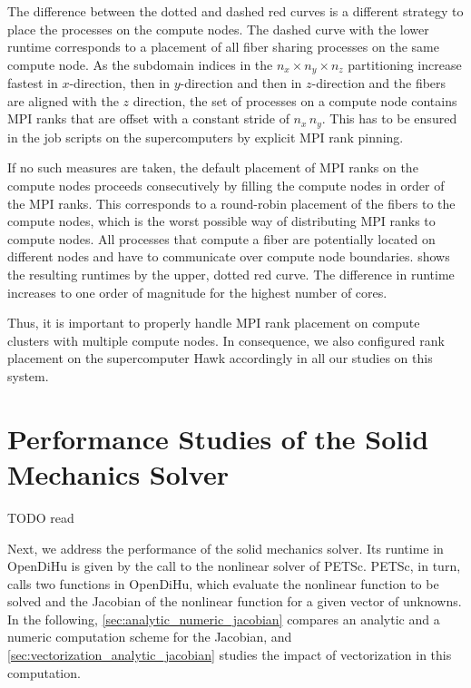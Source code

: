 The difference between the dotted and dashed red curves is a different strategy to place the processes on the compute nodes. The dashed curve with the lower runtime corresponds to a placement of all fiber sharing processes on the same compute node. As the subdomain indices in the $n_x \times n_y \times n_z$ partitioning increase fastest in $x$-direction, then in $y$-direction and then in $z$-direction and the fibers are aligned with the $z$ direction, the set of processes on a compute node contains MPI ranks that are offset with a constant stride of $n_x\,n_y$. This has to be ensured in the job scripts on the supercomputers by explicit MPI rank pinning.

If no such measures are taken, the default placement of MPI ranks on the compute nodes proceeds consecutively by filling the compute nodes in order of the MPI ranks. This corresponds to a round-robin placement of the fibers to the compute nodes, which is the worst possible way of distributing MPI ranks to compute nodes. All processes that compute a fiber are potentially located on different nodes and have to communicate over compute node boundaries.
 shows the resulting runtimes by the upper, dotted red curve. The difference in runtime increases to one order of magnitude for the highest number of cores.

Thus, it is important to properly handle MPI rank placement on compute clusters with multiple compute nodes. In consequence, we also configured rank placement on the supercomputer Hawk accordingly in all our studies on this system.

\fi


\section{Performance Studies of the Solid Mechanics Solver}

TODO read

Next, we address the performance of the solid mechanics solver. 
Its runtime in OpenDiHu is given by the call to the nonlinear solver of PETSc. PETSc, in turn, calls two functions in OpenDiHu, which evaluate the nonlinear function to be solved and the Jacobian of the nonlinear function for a given vector of unknowns.
In the following, \cref{sec:analytic_numeric_jacobian} compares an analytic and a numeric computation scheme for the Jacobian, and \cref{sec:vectorization_analytic_jacobian} studies the impact of vectorization in this computation.

